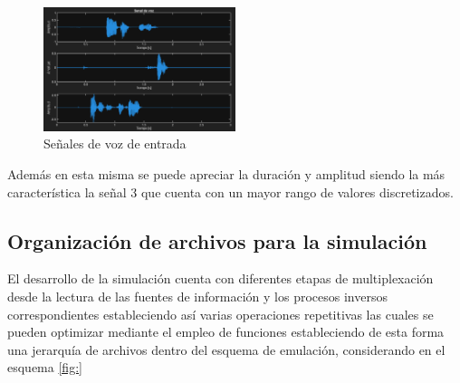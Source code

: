 \documentclass[conference]{IEEEtran}
\begin{document}
	\begin{figure}[h]
		\centering
		\includegraphics[width=0.5\textwidth]{media/input-signals-voice}
		\caption{Señales de voz de entrada}
		\label{fig:input-signals-voice}
	\end{figure}
	
	Además en esta misma se puede apreciar la duración y amplitud siendo la más característica la señal 3 que cuenta con un mayor rango de valores discretizados.
	
	\subsection{\textbf{Organización de archivos para la simulación}}
	
	El desarrollo de la simulación cuenta con diferentes etapas de multiplexación desde la lectura de las fuentes de información y los procesos inversos correspondientes estableciendo así varias operaciones repetitivas las cuales se pueden optimizar mediante el empleo de funciones estableciendo de esta forma una jerarquía de archivos dentro del esquema de emulación, considerando en el esquema \ref{fig:}
	
\end{document}
